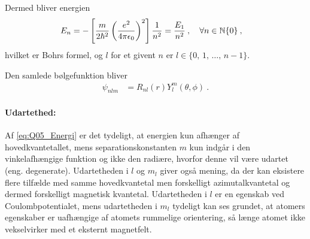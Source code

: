 Dermed bliver energien
\begin{align} \label{eq:Q05_Energi}
    E_n &= -\left[\frac{m}{2\hbar^2}\left(\frac{e^2}{4\pi\epsilon_0}\right)^2\right]\frac{1}{n^2} = \frac{E_1}{n^2} \: , \quad \forall n \in \mathbb{N}\arraybackslash\{0\} \: ,
\end{align}
hvilket er Bohrs formel, og $l$ for et givent $n$ er $l \in \{0,\, 1,\, \ldots,\, n-1\}$.

Den samlede bølgefunktion bliver
\begin{align}
    \psi_{nlm} &= R_{nl}(r)Y_l^m(\theta,\phi) \: .
\end{align}


\paragraph{Udartethed:} Af \cref{eq:Q05_Energi} er det tydeligt, at energien kun afhænger af hovedkvantetallet, mens separationskonstanten $m$ kun indgår i den vinkelafhængige funktion og ikke den radiære, hvorfor denne vil være udartet (eng. degenerate). Udartetheden i $l$ og $m_l$ giver også mening, da der kan eksistere flere tilfælde med samme hovedkvantetal men forskelligt azimutalkvantetal og dermed forskelligt magnetisk kvantetal. Udartetheden i $l$ er en egenskab ved Coulombpotentialet, mens udartetheden i $m_l$ tydeligt kan ses grundet, at atomers egenskaber er uafhængige af atomets rummelige orientering, så længe atomet ikke vekselvirker med et eksternt magnetfelt.